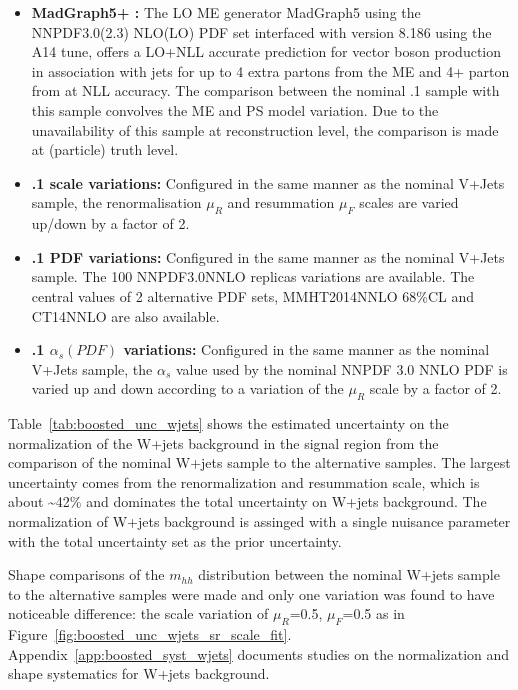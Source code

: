 \begin{itemize}
\item \textbf{MadGraph5+ :} The LO ME generator MadGraph5 using the NNPDF3.0(2.3) NLO(LO) PDF set interfaced
with  version 8.186 using the A14 tune, offers a LO+NLL accurate prediction for vector boson production in association
with jets for up to 4 extra partons from the ME and 4+ parton from  at NLL accuracy. The comparison between the nominal  
.1 sample with this sample convolves the ME and PS model variation. Due to the unavailability of this sample at
reconstruction level, the comparison is made at (particle) truth level.
 
\item \textbf{.1 scale variations:} Configured in the same manner as the nominal V+Jets sample,
the renormalisation $\mu_{R}$ and resummation $\mu_{F}$ scales are varied up/down by a factor of 2.
 
\item \textbf{.1 PDF variations:} Configured in the same manner as the nominal V+Jets sample. The
100 NNPDF3.0NNLO replicas variations are available. The central values of 2 alternative PDF sets, MMHT2014NNLO 68\%CL and CT14NNLO
are also available.
 
\item \textbf{.1 $\alpha_{s}(PDF)$ variations:} Configured in the same manner as the nominal V+Jets sample,
the $\alpha_{s}$ value used by the nominal NNPDF 3.0 NNLO PDF is varied up and down according to a variation of
the $\mu_{R}$ scale by a factor of 2.
\end{itemize}
 
Table~\ref{tab:boosted_unc_wjets} shows the estimated uncertainty on the normalization of the W+jets background in the signal region
from the comparison of the nominal W+jets sample to the alternative samples.  The largest uncertainty comes from the renormalization
and resummation scale, which is about \textasciitilde42\% and dominates the total uncertainty on W+jets background. The normalization of W+jets
background is assinged with a single nuisance parameter with the total uncertainty set as the prior uncertainty.
 
Shape comparisons of the $m_{hh}$ distribution between the nominal W+jets sample to the alternative samples were made and only one
variation was found to have noticeable difference: the scale variation of $\mu_{R}$=0.5, $\mu_{F}$=0.5 as in Figure~\ref{fig:boosted_unc_wjets_sr_scale_fit}.
Appendix~\ref{app:boosted_syst_wjets} documents studies on the normalization and shape systematics for W+jets background.
 
